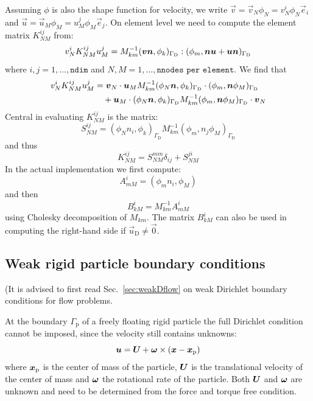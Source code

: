 Assuming $\phi$ is also the shape function for velocity, we write
$\vec v=\vec v_N\phi_N=v_N^i\phi_N\vec e_i$ and $\vec u=\vec
u_M\phi_M=u_M^j\phi_M\vec e_j$.
On element level we need to compute the element matrix $K_{NM}^{ij}$ from: 
\begin{equation}
   v^i_NK_{NM}^{ij}u^j_M=
     M^{-1}_{km}(\boldsymbol{v}\boldsymbol{n},\phi_k)_{\Gamma_\text{D}}:(\phi_m,\boldsymbol{n}\boldsymbol{u}
        +\boldsymbol{u}\boldsymbol{n})_{\Gamma_\text{D}}
\end{equation}
where $i,j=1,\dots,\texttt{ndim}$ and $N,M=1,\dots,\texttt{nnodes per element}$.
We find that
\begin{equation}
\begin{split}
   v^i_NK_{NM}^{ij}u^j_M&=
     \boldsymbol{v}_N\cdot\boldsymbol{u}_M M^{-1}_{km}(\phi_N\boldsymbol{n},\phi_k)_{\Gamma_\text{D}}\cdot
(\phi_m,\boldsymbol{n}\phi_M)_{\Gamma_\text{D}}\\
&\quad+ \boldsymbol{u}_M\cdot(\phi_N\boldsymbol{n},\phi_k)_{\Gamma_\text{D}}M^{-1}_{km}(\phi_m,\boldsymbol{n}\phi_M)_{\Gamma_\text{D}}\cdot\boldsymbol{v}_N
\end{split}
\end{equation}
 Central in evaluating
$K_{NM}^{ij}$ is the matrix:
\begin{equation}
   S_{NM}^{ij} =
(\phi_Nn_i,\phi_k)_{\Gamma_\text{D}}M^{-1}_{km}(\phi_m,n_j\phi_M)_{\Gamma_\text{D}} 
\end{equation}
and thus
\begin{equation}
   K_{NM}^{ij}=S_{NM}^{mm}\delta_{ij}+S_{NM}^{ji}
\end{equation}
In the actual implementation we first compute:
\begin{equation}
   A_{mM}^i=(\phi_mn_i,\phi_M)
\end{equation}
and then
\begin{equation}
   B_{kM}^i=M^{-1}_{km}A_{mM}^i
\end{equation}
using Cholesky decomposition of $M_{km}$. The matrix $B_{kM}^i$ can also be
used in computing the right-hand side if $\vec u_\text{D}\neq\vec 0$.

\subsection{Weak rigid particle boundary conditions}
\label{sec:weakparticle}

(It is advised to first read Sec.~\ref{sec:weakDflow} on weak Dirichlet
boundary conditions for flow problems.

At the boundary $\Gamma_\text{p}$ of a freely floating rigid particle
the full Dirichlet condition cannot be
imposed, since the velocity still contains unknowns:
\begin{equation}
   \boldsymbol{u} = \boldsymbol{U} + \boldsymbol{\omega} \times (\boldsymbol{x} - \boldsymbol{x}_\text{p})
   \label{eq:velocitypar}
\end{equation}
where $\boldsymbol{x}_\text{p}$ is the center of mass of the particle,
$\boldsymbol{U}$ is the translational velocity of the center of mass and $\boldsymbol{\omega}$
the rotational rate of the particle. Both $\boldsymbol{U}$ and
 $\boldsymbol{\omega}$ are unknown and
need to be determined from the force and torque free condition.

